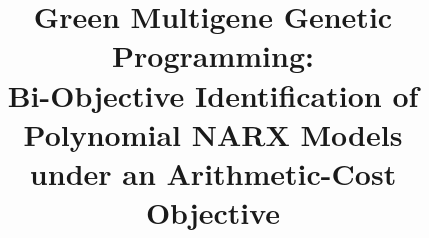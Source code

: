 \documentclass[11pt,a4paper]{article}
\theoremstyle{definition}
\theoremstyle{plain}
\theoremstyle{remark}
\begin{document}
\title{Green Multigene Genetic Programming:\\ Bi-Objective Identification of Polynomial NARX Models\\ under an Arithmetic-Cost Objective}

\author{}
\date{}

\maketitle



% 




% 




\end{document}
